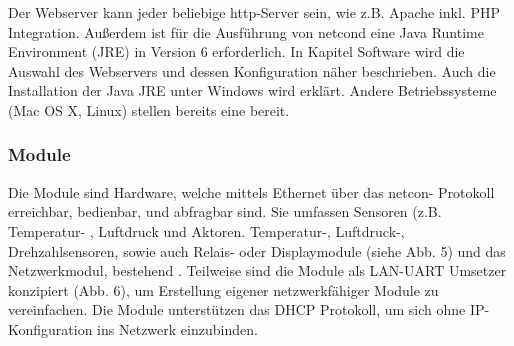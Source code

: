 \documentclass[a4paper,14pt,headsepline]{scrartcl}
\begin{document}
Der Webserver kann jeder beliebige http-Server sein, wie z.B. Apache inkl. PHP Integration. Außerdem ist für die Ausführung von netcond eine Java Runtime Environment (JRE) in Version 6 erforderlich. In Kapitel Software wird die Auswahl des Webservers und dessen Konfiguration näher beschrieben. Auch die Installation der Java JRE unter Windows wird erklärt. Andere Betriebssysteme (Mac OS X, Linux) stellen bereits eine bereit.

\newpage

\subsubsection{Module}

Die Module sind Hardware, welche mittels Ethernet über das netcon- Protokoll erreichbar, bedienbar, und abfragbar sind. Sie umfassen Sensoren (z.B. Temperatur- , Luftdruck und Aktoren. Temperatur-, Luftdruck-, Drehzahlsensoren, sowie auch Relais- oder Displaymodule (siehe Abb. 5) und das Netzwerkmodul, bestehend . Teilweise sind die Module als LAN-UART Umsetzer konzipiert (Abb. 6), um Erstellung eigener netzwerkfähiger Module zu vereinfachen. Die Module unterstützen das DHCP Protokoll, um sich ohne IP-Konfiguration ins Netzwerk einzubinden.



\begin{figure}[h]
\begin{center}
\end{center}
\end{figure}
\end{document}
